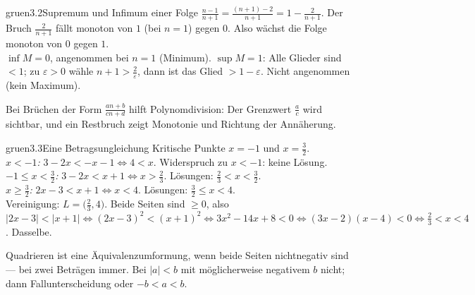 \begin{loesungkarte}{gruen}{3.2}{Supremum und Infimum einer Folge}
$\frac{n - 1}{n + 1} = \frac{(n + 1) - 2}{n + 1} = 1 - \frac2{n + 1}$. Der Bruch $\frac2{n + 1}$ fällt monoton von $1$ (bei $n = 1$) gegen $0$. Also wächst die Folge monoton von $0$ gegen $1$. \\
$\inf M = 0$, angenommen bei $n = 1$ (Minimum). $\sup M = 1$: Alle Glieder sind $< 1$; zu $\varepsilon > 0$ wähle $n + 1 > \frac2\varepsilon$, dann ist das Glied $> 1 - \varepsilon$. Nicht angenommen (kein Maximum).
\begin{mitnehmen}\kastentext
Bei Brüchen der Form $\frac{an + b}{cn + d}$ hilft Polynomdivision: Der Grenzwert $\frac ac$ wird sichtbar, und ein Restbruch zeigt Monotonie und Richtung der Annäherung.
\end{mitnehmen}
\end{loesungkarte}

\begin{loesungkarte}{gruen}{3.3}{Eine Betragsungleichung}
Kritische Punkte $x = -1$ und $x = \frac32$. \\
\emph{$x < -1$:} $3 - 2x < -x - 1\iff4 < x$. Widerspruch zu $x < -1$: keine Lösung. \\
\emph{$-1\le x < \frac32$:} $3 - 2x < x + 1\iff x > \frac23$. Lösungen: $\frac23 < x < \frac32$. \\
\emph{$x\ge\frac32$:} $2x - 3 < x + 1\iff x < 4$. Lösungen: $\frac32\le x < 4$. \\
Vereinigung: $L = \bigl(\frac23, 4\bigr)$.
Beide Seiten sind $\ge0$, also $|2x - 3| < |x + 1|\iff(2x - 3)^{2} < (x + 1)^{2}\iff3x^{2} - 14x + 8 < 0\iff(3x - 2)(x - 4) < 0\iff\frac23 < x < 4$. Dasselbe.
\begin{mitnehmen}\kastentext
Quadrieren ist eine Äquivalenzumformung, wenn beide Seiten nichtnegativ sind --- bei zwei Beträgen immer. Bei $|a| < b$ mit möglicherweise negativem $b$ nicht; dann Fallunterscheidung oder $-b < a < b$.
\end{mitnehmen}
\end{loesungkarte}

